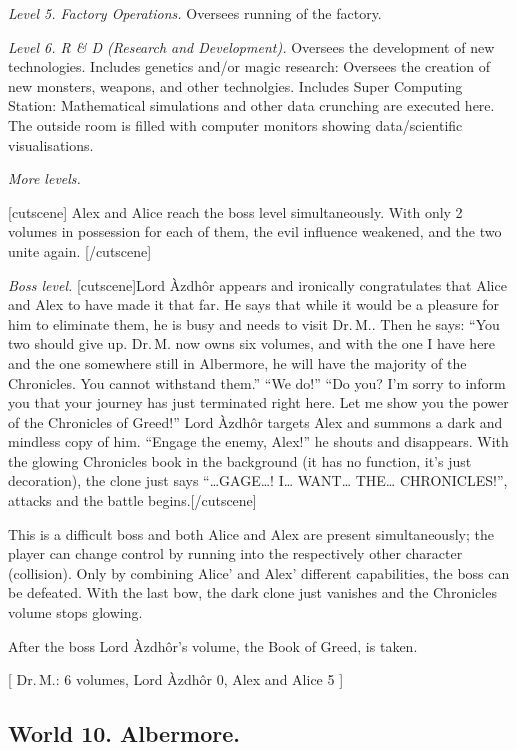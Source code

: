 \documentclass{gd-document}
\newcommand\DrM{Dr.\,M.\xspace}
\newcommand\Azdhor{Lord Àzdhôr\xspace}
\newcommand\level[1]{\textit{#1}}
\begin{document}
\level{Level 5. Factory Operations.} Oversees running of the factory.

\level{Level 6. R \& D (Research and Development).} Oversees the development of
  new technologies. Includes genetics and/or magic research: Oversees
  the creation of new monsters, weapons, and other
  technolgies. Includes Super Computing Station: Mathematical
  simulations and other data crunching are executed here. The outside
  room is filled with computer monitors showing data/scientific
  visualisations.

\level{More levels.}
  
[cutscene]
Alex and Alice reach the boss level simultaneously. With only 2
volumes in possession for each of them, the evil influence weakened,
and the two unite again.
[/cutscene]

\level{Boss level.} [cutscene]\Azdhor appears and ironically
congratulates that Alice and Alex to have made it that far. He says
that while it would be a pleasure for him to eliminate them, he is
busy and needs to visit \DrM. Then he says: “You two should give
up. \DrM now owns six volumes, and with the one I have here and the
one somewhere still in Albermore, he will have the majority of the
Chronicles. You cannot withstand them.” “We do!” “Do you? I'm sorry to
inform you that your journey has just terminated right here. Let me
show you the power of the Chronicles of Greed!” \Azdhor targets Alex
and summons a dark and mindless copy of him. “Engage the enemy, Alex!”
he shouts and disappears. With the glowing Chronicles book in the
background (it has no function, it’s just decoration), the clone just
says “…GAGE…! I… WANT… THE… CHRONICLES!”, attacks and the battle
begins.[/cutscene]

This is a difficult boss and both Alice and Alex are present
simultaneously; the player can change control by running into the
respectively other character (collision). Only by combining Alice’ and
Alex’ different capabilities, the boss can be defeated. With the last
bow, the dark clone just vanishes and the Chronicles volume stops
glowing.

After the boss \Azdhor{}’s volume, the Book of
Greed, is taken.

[ \DrM: 6 volumes, \Azdhor 0, Alex and Alice 5 ]

\subsection{World 10. Albermore.}
\end{document}
